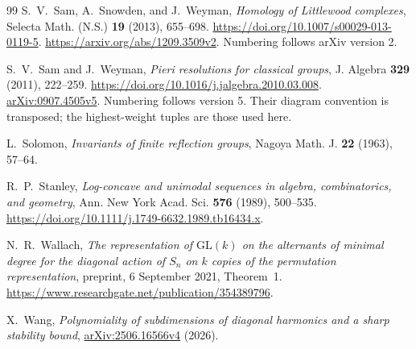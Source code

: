 \begin{thebibliography}{99}
S.~V.~Sam, A.~Snowden, and J.~Weyman,
\emph{Homology of Littlewood complexes},
Selecta Math. (N.S.) \textbf{19} (2013), 655--698.
\url{https://doi.org/10.1007/s00029-013-0119-5}.
\url{https://arxiv.org/abs/1209.3509v2}.
Numbering follows arXiv version 2.

S.~V.~Sam and J.~Weyman,
\emph{Pieri resolutions for classical groups},
J. Algebra \textbf{329} (2011), 222--259.
\url{https://doi.org/10.1016/j.jalgebra.2010.03.008}.
\href{https://arxiv.org/abs/0907.4505v5}{arXiv:0907.4505v5}.
Numbering follows version 5. Their diagram convention is transposed;
the highest-weight tuples are those used here.

L.~Solomon,
\emph{Invariants of finite reflection groups},
Nagoya Math. J. \textbf{22} (1963), 57--64.

R.~P.~Stanley,
\emph{Log-concave and unimodal sequences in algebra,
combinatorics, and geometry},
Ann. New York Acad. Sci. \textbf{576} (1989), 500--535.
\url{https://doi.org/10.1111/j.1749-6632.1989.tb16434.x}.

N.~R.~Wallach,
\emph{The representation of $\mathrm{GL}(k)$ on the alternants of
minimal degree for the diagonal action of $S_n$ on $k$ copies of
the permutation representation}, preprint, 6 September 2021,
Theorem~1.
\url{https://www.researchgate.net/publication/354389796}.

X.~Wang,
\emph{Polynomiality of subdimensions of diagonal harmonics and a sharp stability bound},
\href{https://arxiv.org/abs/2506.16566v4}{arXiv:\allowbreak 2506.16566v4} (2026).

\end{thebibliography}
